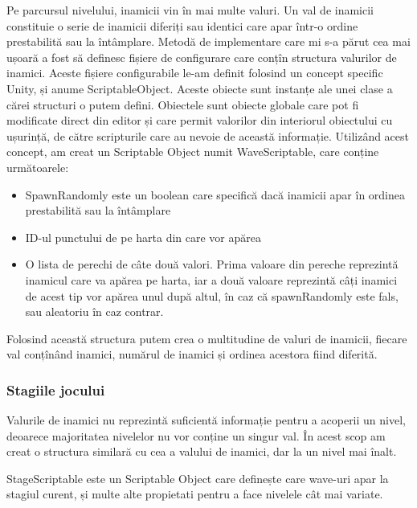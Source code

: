 \documentclass[12pt, a4paper]{article}
\begin{document}
	Pe parcursul nivelului, inamicii vin în mai multe valuri. Un val de inamicii constituie o serie de inamicii diferiți sau identici care apar într-o ordine prestabilită sau la întâmplare. Metodă de implementare care mi s-a părut cea mai ușoară a fost să definesc fișiere de configurare care conțîn structura valurilor de inamici. Aceste fișiere configurabile le-am definit folosind un concept specific Unity, și anume ScriptableObject. Aceste obiecte sunt instanțe ale unei clase a cărei structuri o putem defini. Obiectele sunt obiecte globale care pot fi modificate direct din editor și care permit valorilor din interiorul obiectului cu ușurință, de către scripturile care au nevoie de această informație. Utilizând acest concept, am creat un Scriptable Object numit WaveScriptable, care conține următoarele:
	
	\begin{itemize}
		\item SpawnRandomly este un boolean care specifică dacă inamicii apar în ordinea prestabilită sau la întâmplare
		\item ID-ul punctului de pe harta din care vor apărea
		\item O lista de perechi de câte două valori. Prima valoare din pereche reprezintă inamicul care va apărea pe harta, iar a două valoare reprezintă câți inamici de acest tip vor apărea unul după altul, în caz că spawnRandomly este fals, sau aleatoriu în caz contrar.
	\end{itemize}
	
	Folosind această structura putem crea o multitudine de valuri de inamicii, fiecare val conțînând inamici, numărul de inamici și ordinea acestora fiind diferită.
	
	
	
	
	
	\subsubsection{Stagiile jocului}
	\label{section: stageScriptable}
	
	Valurile de inamici nu reprezintă suficientă informație pentru a acoperii un nivel, deoarece majoritatea nivelelor nu vor conține un singur val. În acest scop am creat o structura similară cu cea a valului de inamici, dar la un nivel mai înalt.
	\newline
	
	StageScriptable este un Scriptable Object care definește care wave-uri apar la stagiul curent, și multe alte propietati pentru a face nivelele cât mai variate.
	
\end{document}
